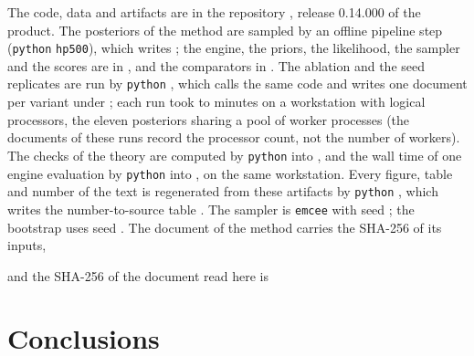 \documentclass[journal]{IEEEtran}
\newcommand{\productrelease}{0.14.000}
\begin{document}
The code, data and artifacts are in the repository , release
\productrelease{} of the product. The posteriors of the method are sampled by an offline pipeline step (\texttt{python}
\texttt{hp500}), which writes ; the engine, the priors, the likelihood, the sampler
and the scores are in , and the comparators in
. The ablation and the seed replicates are run by \texttt{python}
, which calls the same code and writes one document per variant under
; each run took \wallMin{} to \wallMax{} minutes on a workstation with \ablCpu{}
logical processors, the eleven posteriors sharing a pool of worker processes (the documents of these runs record the
processor count, not the number of workers). The checks of the theory are computed by \texttt{python}
 into , and the
wall time of one engine evaluation by \texttt{python}  into
, on the same workstation. Every figure,
table and number of the text is regenerated from these artifacts by \texttt{python}
, which writes the number-to-source table
. The sampler is \texttt{emcee} \samplerVersion{} with seed \seed; the bootstrap uses
seed \bootSeed. The document of the method carries the SHA-256 of its inputs,
\begin{center}\texttt{\tiny\sha}\end{center}
and the SHA-256 of the document read here is
\begin{center}\texttt{\tiny\shaDoc}\end{center}

\section{Conclusions}\label{sec:conclusions}
\end{document}
